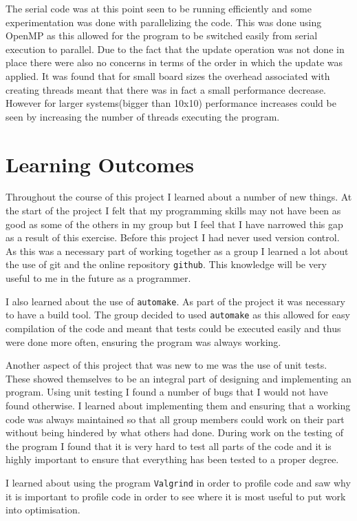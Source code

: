 \documentclass[12pt]{article}    %
\numberwithin{equation}{section}
\begin{document}
The serial code was at this point seen to be running efficiently and some experimentation was done with parallelizing the code.
This was done using OpenMP as this allowed for the program to be switched easily from serial execution to parallel.
Due to the fact that the update operation was not done in place there were also no concerns in terms of the order in which the update was applied.
It was found that for small board sizes the overhead associated with creating threads meant that there was in fact a small performance decrease.
However for larger systems(bigger than 10x10) performance increases could be seen by increasing the number of threads executing the program.

\section{Learning Outcomes}
Throughout the course of this project I learned about a number of new things.
At the start of the project I felt that my programming skills may not have been as good as some of the others in my group but I feel that I have narrowed this gap as a result of this exercise.
Before this project I had never used version control.
As this was a necessary part of working together as a group I learned a lot about the use of git and the online repository \texttt{github}.
This knowledge will be very useful to me in the future as a programmer.

I also learned about the use of \texttt{automake}.
As part of the project it was necessary to have a build tool.
The group decided to used \texttt{automake} as this allowed for easy compilation of the code and meant that tests could be executed easily and thus were done more often, ensuring the program was always working.

Another aspect of this project that was new to me was the use of unit tests.
These showed themselves to be an integral part of designing and implementing an program.
Using unit testing I found a number of bugs that I would not have found otherwise.
I learned about implementing them and ensuring that a working code was always maintained so that all group members could work on their part without being hindered by what others had done.
During work on the testing of the program I found that it is very hard to test all parts of the code and it is highly important to ensure that everything has been tested to a proper degree.

I learned about using the program \texttt{Valgrind} in order to profile code and saw why it is important to profile code in order to see where it is most useful to put work into optimisation.
\end{document}
